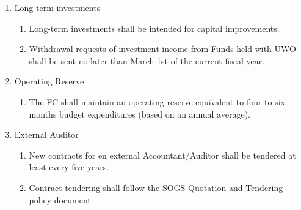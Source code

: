 \begin{enumerate}[label*=\arabic*., align=left]
\begin{enumerate}[label*=\arabic*., align=left]
	\end{enumerate}
\item Long-term investments
\begin{enumerate}[label*=\arabic*., align=left]
	\item Long-term investments shall be intended for capital improvements.
	\item Withdrawal requests of investment income from Funds held with UWO shall be sent no later than March 1st of the current fiscal year.
	\end{enumerate}
\item Operating Reserve
\begin{enumerate}[label*=\arabic*., align=left]
	\item The FC shall maintain an operating reserve equivalent to four to six months budget expenditures (based on an annual average). 
	\end{enumerate}
\item External Auditor
\begin{enumerate}[label*=\arabic*., align=left]
	\item New contracts for en external Accountant/Auditor shall be tendered at least every five years.
	\item Contract tendering shall follow the SOGS Quotation and Tendering policy document.
	\end{enumerate}
\end{enumerate}
